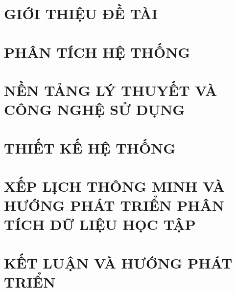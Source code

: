 \documentclass[a4paper,13pt,3p,twoside]{report}
\theoremstyle{definition}
\begin{document}
\glsaddall 
 \renewcommand*{\glossaryname}{Danh sách thuật ngữ}
\renewcommand*{\acronymname}{DANH MỤC THUẬT NGỮ VÀ TỪ VIẾT TẮT}
\renewcommand*{\entryname}{Thuật ngữ}
\renewcommand*{\descriptionname}{Ý nghĩa}
\printnoidxglossaries


% 


\newpage
{}

\pagestyle{fancy}
\fancyhf{}
\fancyhead[RE, LO]{\leftmark}
\fancyfoot[RE, LO]{\thepage}

\chapter{GIỚI THIỆU ĐỀ TÀI}
\label{chapter:Introduction}


\newpage
\chapter{PHÂN TÍCH HỆ THỐNG}
\label{chapter:Analysis}



\newpage
\chapter{NỀN TẢNG LÝ THUYẾT VÀ CÔNG NGHỆ SỬ DỤNG}
\label{chapter:Methodology}


\newpage
\chapter{THIẾT KẾ HỆ THỐNG}
\label{chapter:Design}


\newpage
\chapter{XẾP LỊCH THÔNG MINH VÀ HƯỚNG PHÁT TRIỂN PHÂN TÍCH DỮ LIỆU HỌC TẬP}
\label{chapter:Scheduling}

\newpage
\chapter{KẾT LUẬN VÀ HƯỚNG PHÁT TRIỂN} %
\label{chapter:conclusion}

\end{document}
